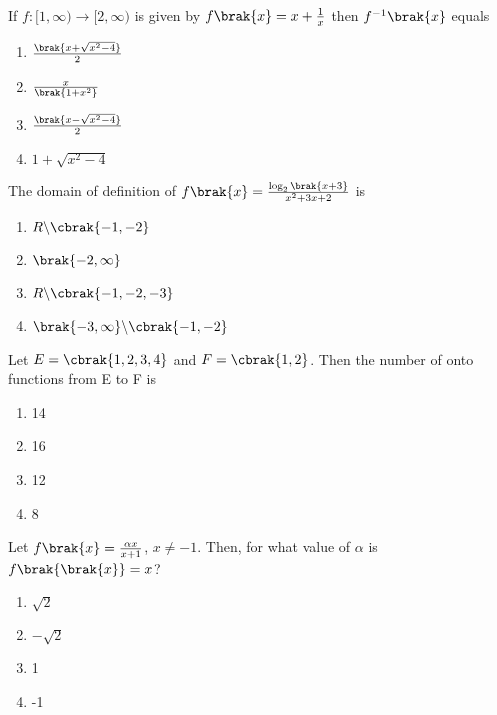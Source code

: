 \item If $f:[1,\infty)\to[2,\infty)$ is given by $f\brak{x}=x+\frac{1}{x}$ then $f^{-1}\brak{x}$ equals
\hfill{}
\begin{multicols}{2}
	\begin{enumerate}
		\item $\frac{\brak{x+\sqrt{x^{2}-4}}}{2}$ 
		\item $\frac{x}{\brak{1+x^{2}}}$
		\item $\frac{\brak{x-\sqrt{x^{2}-4}}}{2}$ 
		\item $1+\sqrt{x^{2}-4}$
	\end{enumerate}
\end{multicols}

\item The domain of definition of $f\brak{x}=\frac{\log_{2}{\brak{x+3}}}{x^{2}+3x+2}$ is
\hfill{}
\begin{multicols}{2}
	\begin{enumerate}
		\item $R \backslash \cbrak{-1,-2}$ 
		\item $\brak{-2,\infty}$
		\item $R \backslash \cbrak{-1,-2,-3}$ 
		\item $\brak{-3,\infty}\backslash\cbrak{-1,-2}$
	\end{enumerate}
\end{multicols}
                                                                                        
\item Let $E=\cbrak{1,2,3,4}$ and $F=\cbrak{1,2}$. Then the number of onto functions from E to F is
\hfill{}
\begin{multicols}{4}
	\begin{enumerate}
		\item 14 
		\item 16 
		\item 12 
		\item 8
	\end{enumerate}
\end{multicols}

\item Let $f\brak{x}=\frac{\alpha x}{x+1}$, $x\neq-1$. Then, for what value of $\alpha$ is $f\brak{\brak{x}}=x$?
\hfill{}
\begin{multicols}{4}
	\begin{enumerate}
		\item $\sqrt{2}$ 
		\item $-\sqrt{2}$ 
		\item 1 
		\item -1
	\end{enumerate}
\end{multicols}


%
